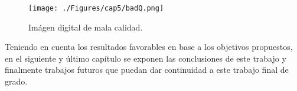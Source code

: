  \begin{figure}[H]
	\centering
		\texttt{[image: ./Figures/cap5/badQ.png]}
	\caption{Imágen digital de mala calidad.}

	\label{fig:badQuality}
\end{figure}
 



 
Teniendo en cuenta los resultados favorables en base a los objetivos propuestos, en el siguiente y último capítulo se exponen las conclusiones de este trabajo  y finalmente trabajos futuros que puedan dar continuidad a este trabajo final de grado.